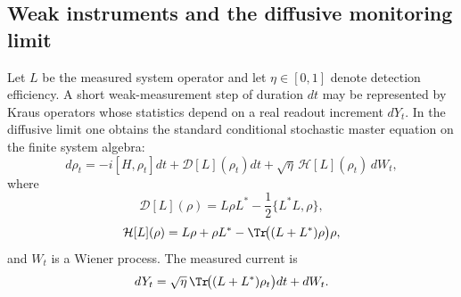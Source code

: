 \documentclass[12pt,a4paper]{article}
\begin{document}
\subsection{Weak instruments and the diffusive monitoring limit}
\label{p4:sec:part3-weak-monitoring}

Let $L$ be the measured system operator and let $\eta\in[0,1]$ denote detection efficiency.
A short weak-measurement step of duration $dt$ may be represented by Kraus operators whose statistics depend on a real readout increment $dY_t$.
In the diffusive limit one obtains the standard conditional stochastic master equation on the finite system algebra:
\begin{equation}
\label{p4:eq:sme}
d\rho_t = -i[H,\rho_t]dt + \mathcal D[L](\rho_t)dt + \sqrt{\eta}\,\mathcal H[L](\rho_t)\,dW_t,
\end{equation}
where
\begin{equation}
\label{p4:eq:d-super}
\mathcal D[L](\rho)=L\rho L^* - \frac12\{L^*L,\rho\},
\end{equation}
\begin{equation}
\label{p4:eq:h-super}
\mathcal H[L](\rho)=L\rho+\rho L^* - \Tr\!\bigl((L+L^*)\rho\bigr)\rho,
\end{equation}
and $W_t$ is a Wiener process.
The measured current is
\begin{equation}
\label{p4:eq:meas-current}
dY_t = \sqrt{\eta}\,\Tr\!\bigl((L+L^*)\rho_t\bigr)dt + dW_t.
\end{equation}
\end{document}
